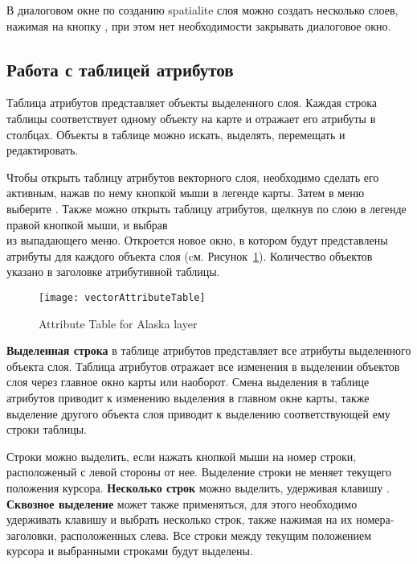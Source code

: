В диалоговом окне по созданию spatialite слоя можно создать несколько слоев,
нажимая на кнопку , при этом нет необходимости закрывать
диалоговое окно.

\subsection{Работа с таблицей атрибутов}
\label{sec:attribute table}

Таблица атрибутов представляет объекты выделенного слоя. Каждая строка таблицы
соответствует одному объекту на карте и отражает его атрибуты в столбцах.
Объекты в таблице можно искать, выделять, перемещать и редактировать.

Чтобы открыть таблицу атрибутов векторного слоя, необходимо сделать его активным,
нажав по нему кнопкой мыши в легенде карты. Затем в меню 
выберите .
Также можно открыть таблицу атрибутов, щелкнув по слою в легенде правой
кнопкой мыши, и выбрав \\
из выпадающего меню. Откроется новое окно, в котором будут представлены атрибуты
для каждого объекта слоя (cм. Рисунок~\ref{fig:attributetable}). Количество
объектов указано в заголовке атрибутивной таблицы.

\begin{figure}[ht]
   \centering
   \texttt{[image: vectorAttributeTable]}
   \caption{Attribute Table for Alaska layer \nixcaption}\label{fig:attributetable}
\end{figure}


\textbf{Выделенная строка} в таблице атрибутов представляет все атрибуты
выделенного объекта слоя. Таблица атрибутов отражает все изменения в
выделении объектов слоя через главное окно карты или наоборот. Смена
выделения в таблице атрибутов приводит к изменению выделения в главном
окне карты, также выделение другого объекта слоя приводит к выделению
соответствующей ему строки таблицы.

Строки можно выделить, если нажать кнопкой мыши на номер строки, расположеный
с левой стороны от нее. Выделение строки не меняет текущего положения курсора.
\textbf{Несколько строк} можно выделить, удерживая клавишу .
\textbf{Сквозное выделение} может также применяться, для этого необходимо
удерживать клавишу  и выбрать несколько строк, также
нажимая на их номера-заголовки, расположенных слева. Все строки между
текущим положением курсора и выбранными строками будут выделены.

